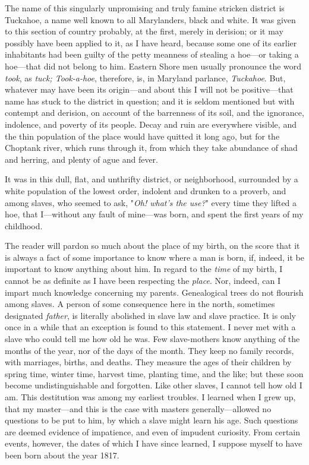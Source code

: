 The name of this singularly unpromising and truly famine stricken
district is Tuckahoe, a name well known to all Marylanders, black and
white. It was given to this section of country probably, at the first,
merely in derision; or it may possibly have been {}applied to it, as I
have heard, because some one of its earlier inhabitants had been guilty
of the petty meanness of stealing a hoe---or taking a hoe---that did not
belong to him. Eastern Shore men usually pronounce the word \emph{took},
as \emph{tuck; Took-a-hoe}, therefore, is, in Maryland parlance,
\emph{Tuckahoe}. But, whatever may have been its origin---and about this
I will not be positive---that name has stuck to the district in
question; and it is seldom mentioned but with contempt and derision, on
account of the barrenness of its soil, and the ignorance, indolence, and
poverty of its people. Decay and ruin are everywhere visible, and the
thin population of the place would have quitted it long ago, but for the
Choptank river, which runs through it, from which they take abundance of
shad and herring, and plenty of ague and fever.

It was in this dull, flat, and unthrifty district, or neighborhood,
surrounded by a white population of the lowest order, indolent and
drunken to a proverb, and among slaves, who seemed to ask, "\emph{Oh!
what's the use?}" every time they lifted a hoe, that I---without any
fault of mine---was born, and spent the first years of my childhood.

The reader will pardon so much about the place of my birth, on the score
that it is always a fact of some importance to know where a man is born,
if, indeed, it be important to know anything about him. In regard to the
\emph{time} of my birth, I cannot be as definite as I have been
respecting the \emph{place}. Nor, indeed, can I impart much knowledge
concerning my parents. Genealogical trees do not flourish among slaves.
A person of some consequence here in the north, {}sometimes designated
\emph{father}, is literally abolished in slave law and slave practice.
It is only once in a while that an exception is found to this statement.
I never met with a slave who could tell me how old he was. Few
slave-mothers know anything of the months of the year, nor of the days
of the month. They keep no family records, with marriages, births, and
deaths. They measure the ages of their children by spring time, winter
time, harvest time, planting time, and the like; but these soon become
undistinguishable and forgotten. Like other slaves, I cannot tell how
old I am. This destitution was among my earliest troubles. I learned
when I grew up, that my master---and this is the case with masters
generally---allowed no questions to be put to him, by which a slave
might learn his age. Such questions are deemed evidence of impatience,
and even of impudent curiosity. From certain events, however, the dates
of which I have since learned, I suppose myself to have been born about
the year 1817.

